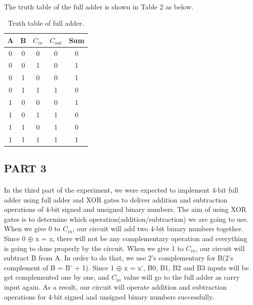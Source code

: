 \documentclass[pdftex,12pt,a4paper]{article}
\begin{document}
\paragraph{}
The truth table of the full adder is shown in Table 2 as below.\newline

\begin{table}[!h]
\begin{center}
    \begin{tabular}{|c|c|c|c|c|}
        \hline
         A & B & $C_{in}$ & $C_{out}$ & Sum \\
         \hline
         0 & 0 & 0 & 0 & 0 \\
         \hline
         0 & 0 & 1 & 0 & 1 \\
         \hline
         0 & 1 & 0 & 0 & 1 \\
         \hline
         0 & 1 & 1 & 1 & 0 \\
         \hline
         1 & 0 & 0 & 0 & 1 \\
         \hline
         1 & 0 & 1 & 1 & 0 \\
         \hline
         1 & 1 & 0 & 1 & 0 \\
         \hline   
         1 & 1 & 1 & 1 & 1 \\
         \hline         
    \end{tabular}
    \caption{Truth table of full adder.}
    \label{table_full}
\end{center}
\end{table}    
\clearpage
\subsection{PART 3}

\paragraph{}
In the third part of the experiment, we were expected to implement 4-bit full adder using full adder and XOR gates to deliver addition and subtraction operations of 4-bit signed and unsigned binary numbers. The aim of using XOR gates is to determine which operation(addition/subtraction) we are going to use. When we give 0 to $C_{in}$, our circuit will add two 4-bit binary numbers together. Since 0 $\oplus$ x = x, there will not be any complementary operation and everything is going to done properly by the circuit. When we give 1 to $C_{in}$, our circuit will subtract B from A. In order to do that, we use 2's complementary for B(2's complement of B = B' + 1). Since 1 $\oplus$ x = x', B0, B1, B2 and B3 inputs will be get complemented one by one, and $C_{in}$ value will go to the full adder as carry input again. As a result, our circuit will operate addition and subtraction operations for 4-bit signed and unsigned binary numbers successfully.
\end{document}

